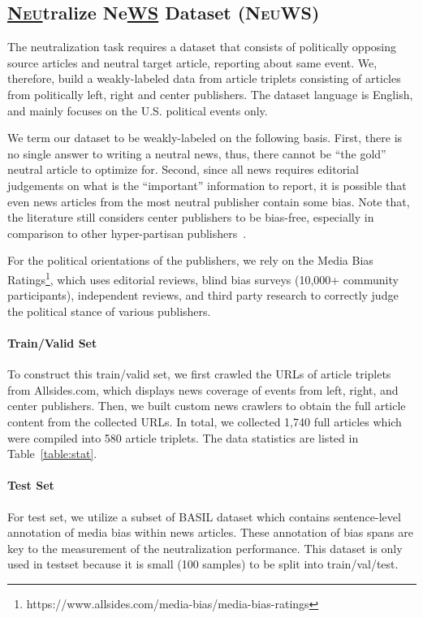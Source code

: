 \documentclass[11pt,a4paper]{article}
\newcommand{\ourdata}{{\scshape NeuWS}}
\begin{document}
\subsection{\underline{\textsc{Neu}}tralize Ne\underline{\textsc{WS}} Dataset (\ourdata)}
The neutralization task requires a dataset that consists of politically opposing source articles and neutral target article, reporting about same event. 
We, therefore, build a weakly-labeled data from article triplets consisting of articles from politically left, right and center publishers. The dataset language is English, and mainly focuses on the U.S. political events only.

We term our dataset to be weakly-labeled on the following basis. First, there is no single answer to writing a neutral news, thus, there cannot be ``the gold'' neutral article to optimize for. Second, since all news requires editorial judgements on what is the ``important'' information to report, it is possible that even news articles from the most neutral publisher contain some bias. Note that, the literature still considers center publishers to be bias-free, especially in comparison to other hyper-partisan publishers~\cite{baum2008new}. 

For the political orientations of the publishers, we rely on the Media Bias Ratings\footnote{https://www.allsides.com/media-bias/media-bias-ratings}, which uses editorial reviews, blind bias surveys (10,000+ community participants), independent reviews, and third party research to correctly judge the political stance of various publishers. 

\paragraph{Train/Valid Set} 
To construct this train/valid set, we first crawled the URLs of article triplets from Allsides.com, which displays news coverage of events from left, right, and center publishers. Then, we built custom news crawlers to obtain the full article content from the collected URLs. In total, we collected 1,740 full articles which were compiled into 580 article triplets. The data statistics are listed in Table~\ref{table:stat}.

\paragraph{Test Set} For test set, we utilize a subset of BASIL dataset \cite{fan2019plain} which contains sentence-level annotation of media bias within news articles. These annotation of bias spans are key to the measurement of the neutralization performance. This dataset is only used in testset because it is small (100 samples) to be split into train/val/test.
\end{document}
